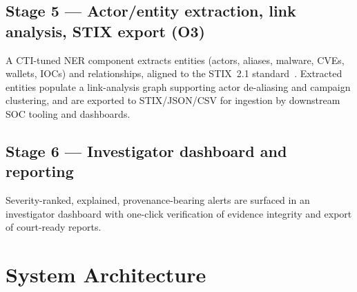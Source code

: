 \documentclass[11pt,a4paper]{article}
\begin{document}
\subsection{Stage 5 --- Actor/entity extraction, link analysis, STIX export (O3)}
A CTI-tuned NER component extracts entities (actors, aliases, malware, CVEs, wallets,
IOCs) and relationships, aligned to the STIX~2.1
standard~\cite{oasisstix21,echchammakhy2025cyberner,feng2025promptbart,wang2022aptner}.
Extracted entities populate a link-analysis graph supporting actor de-aliasing and
campaign clustering, and are exported to STIX/JSON/CSV for ingestion by downstream SOC
tooling and dashboards.

\subsection{Stage 6 --- Investigator dashboard and reporting}
Severity-ranked, explained, provenance-bearing alerts are surfaced in an
investigator dashboard with one-click verification of evidence integrity and export of
court-ready reports.

\section{System Architecture}\label{sec:architecture}
\end{document}
